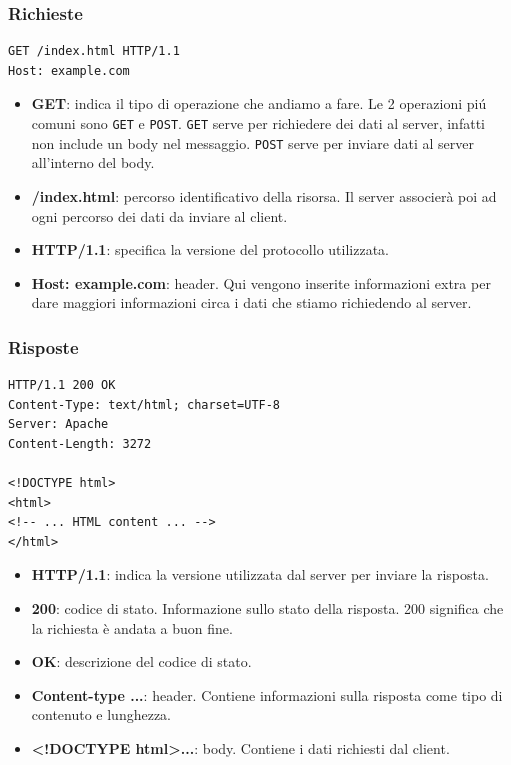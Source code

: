\subsubsection{Richieste}
\begin{verbatim}
GET /index.html HTTP/1.1
Host: example.com
\end{verbatim}
\begin{itemize}[label={}]
  \item \textbf{GET}: indica il tipo di operazione che andiamo a fare. Le 2 operazioni piú comuni sono \texttt{GET} e \texttt{POST}. \texttt{GET} serve per richiedere dei dati al server, infatti non include un body nel messaggio. \texttt{POST} serve per inviare dati al server all'interno del body.
  \item \textbf{/index.html}: percorso identificativo della risorsa. Il server associerà poi ad ogni percorso dei dati da inviare al client.
  \item \textbf{HTTP/1.1}: specifica la versione del protocollo utilizzata.
  \item \textbf{Host: example.com}: header. Qui vengono inserite informazioni extra per dare maggiori informazioni circa i dati che stiamo richiedendo al server.
\end{itemize}

\subsubsection{Risposte}
\begin{verbatim}
HTTP/1.1 200 OK
Content-Type: text/html; charset=UTF-8
Server: Apache
Content-Length: 3272

<!DOCTYPE html>
<html>
<!-- ... HTML content ... -->
</html>
\end{verbatim}
\begin{itemize}[label={}]
  \item \textbf{HTTP/1.1}: indica la versione utilizzata dal server per inviare la risposta.
  \item \textbf{200}: codice di stato. Informazione sullo stato della risposta. 200 significa che la richiesta è andata a buon fine.
  \item \textbf{OK}: descrizione del codice di stato.
  \item \textbf{Content-type ...}: header. Contiene informazioni sulla risposta come tipo di contenuto e lunghezza.
  \item \textbf{\textless!DOCTYPE html\textgreater ...}: body. Contiene i dati richiesti dal client.
\end{itemize}
